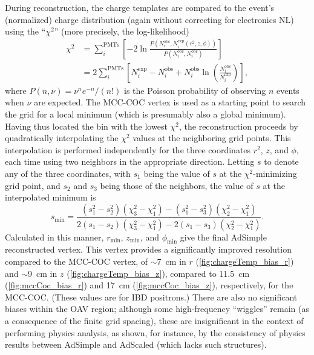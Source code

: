 \documentclass[../thesis.tex]{subfiles}
\begin{document}
\newcommand\Niobs{N_i^{\mathrm{obs}}}
\newcommand\Niexp{N_i^{\mathrm{exp}}}

During reconstruction, the charge templates are compared to the event's (normalized) charge distribution (again without correcting for electronics NL) using the ``$\chi^2$'' (more precisely, the log-likelihood)
\begin{align*}
  \chi^2 &= \sum_i^{\mathrm{PMTs}}\left[ -2 \ln \frac{P(\Niobs, \Niexp(r^2, z, \phi))}
        {P(\Niobs, \Niobs)} \right] \\
      &= 2 \sum_i^{\mathrm{PMTs}} \left[ \Niexp - \Niobs+ \Niobs \ln \left( \frac{\Niobs}{\Niexp} \right) \right],
\end{align*}
where $P(n, \nu) = \nu^n e^{-n} / (n!)$ is the Poisson probability of observing $n$ events when $\nu$ are expected. The MCC-COC vertex is used as a starting point to search the grid for a local minimum (which is presumably also a global minimum). Having thus located the bin with the lowest $\chi^2$, the reconstruction proceeds by quadratically interpolating the $\chi^2$ values at the neighboring grid points. This interpolation is performed independently for the three coordinates $r^2$, $z$, and $\phi$, each time using two neighbors in the appropriate direction. Letting $s$ to denote any of the three coordinates, with $s_1$ being the value of $s$ at the $\chi^2$-minimizing grid point, and $s_2$ and $s_3$ being those of the neighbors, the value of $s$ at the interpolated minimum is
\begin{equation}
  s_{\mathrm{min}} = \frac{(s_1^2 - s_2^2)(\chi_3^2 - \chi_1^2) - (s_1^2 - s_3^2)(\chi_2^2 - \chi_1^2)}{2(s_1 - s_2)(\chi_3^2 - \chi_1^2) - 2(s_1 - s_3)(\chi_2^2 - \chi_1^2)}.
\end{equation}
Calculated in this manner, $r_{\mathrm{min}}$, $z_{\mathrm{min}}$, and $\phi_{\mathrm{min}}$ give the final AdSimple reconstructed vertex. This vertex provides a significantly improved resolution compared to the MCC-COC vertex, of $\sim$7~cm in $r$ (\autoref{fig:chargeTemp_bias_r}) and $\sim$9~cm in $z$ (\autoref{fig:chargeTemp_bias_z}), compared to 11.5~cm (\autoref{fig:mccCoc_bias_r}) and 17~cm (\autoref{fig:mccCoc_bias_z}), respectively, for the MCC-COC. (These values are for IBD positrons.) There are also no significant biases within the OAV region; although some high-frequency ``wiggles'' remain (as a consequence of the finite grid spacing), these are insignificant in the context of performing physics analysis, as shown, for instance, by the consistency of physics results between AdSimple and AdScaled (which lacks such structures).
\end{document}

